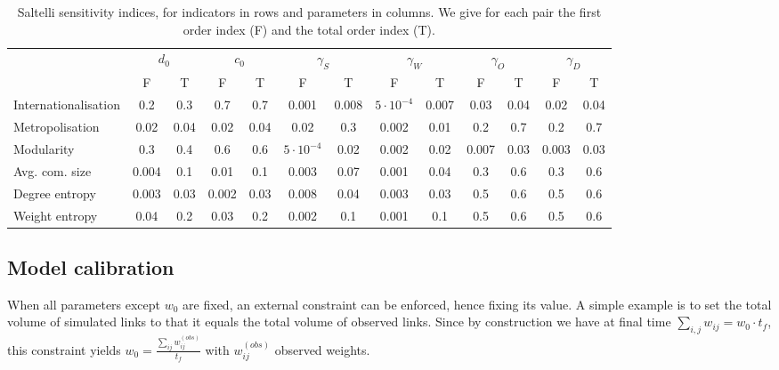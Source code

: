 \begin{table}[h!]
\begin{adjustwidth}{-2.25in}{0in}
\caption{Saltelli sensitivity indices, for indicators in rows and parameters in columns. We give for each pair the first order index (F) and the total order index (T).\label{tab:saltelli}}
\hspace{-1cm}\begin{tabular}{|l|c|c|c|c|c|c|c|c|c|c|c|c|}
\hline
 & \multicolumn{2}{|c|}{$d_0$} & \multicolumn{2}{|c|}{$c_0$} & \multicolumn{2}{|c|}{$\gamma_S$} & \multicolumn{2}{|c|}{$\gamma_W$} & \multicolumn{2}{|c|}{$\gamma_O$} & \multicolumn{2}{|c|}{$\gamma_D$} \\
 & F & T & F & T & F & T & F & T & F & T & F & T \\
 \hline
Internationalisation & 0.2 & 0.3 & 0.7 & 0.7 & 0.001 & 0.008 & $5\cdot 10^{-4}$ & 0.007 & 0.03 & 0.04 & 0.02 & 0.04 \\
Metropolisation & 0.02 & 0.04 & 0.02 & 0.04 & 0.02 & 0.3 & 0.002 & 0.01 & 0.2 & 0.7 & 0.2 & 0.7 \\
Modularity & 0.3 & 0.4 & 0.6 & 0.6 & $5\cdot 10^{-4}$ & 0.02 & 0.002 & 0.02 & 0.007 & 0.03 & 0.003 & 0.03 \\
Avg. com. size & 0.004 & 0.1 & 0.01 & 0.1 & 0.003 & 0.07 & 0.001 & 0.04 & 0.3 & 0.6 & 0.3 & 0.6 \\
Degree entropy & 0.003 & 0.03 & 0.002 & 0.03 & 0.008 & 0.04 & 0.003 & 0.03 & 0.5 & 0.6 & 0.5 & 0.6 \\
Weight entropy & 0.04 & 0.2 & 0.03 & 0.2 & 0.002 & 0.1 & 0.001 & 0.1 & 0.5 & 0.6 & 0.5 & 0.6 \\\hline
\end{tabular}
\end{adjustwidth}
\end{table}


\subsection*{Model calibration}

When all parameters except $w_0$ are fixed, an external constraint can be enforced, hence fixing its value. A simple example is to set the total volume of simulated links to that it equals the total volume of observed links. Since by construction we have at final time $\sum_{i,j} w_{ij} = w_0 \cdot t_f$, this constraint yields $w_0 = \frac{\sum_{ij} w_{ij}^{(obs)}}{t_f}$ with $w_{ij}^{(obs)}$ observed weights.

